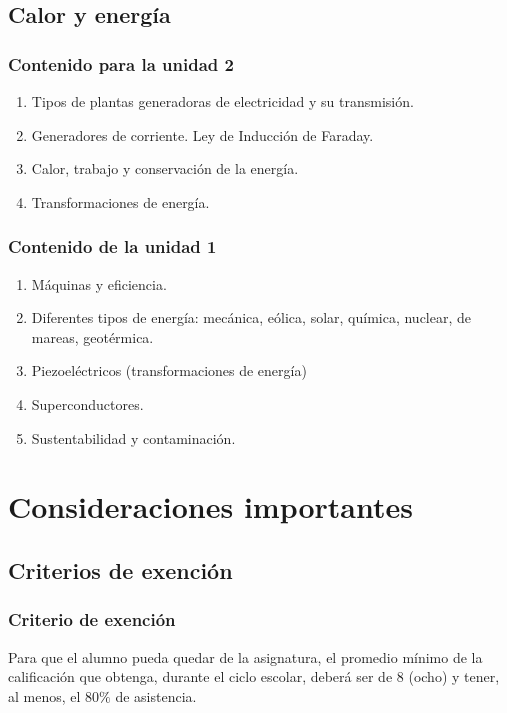 \documentclass[14pt]{beamer}
\begin{document}
\subsection{Calor y energía}

\begin{frame}
\frametitle{Contenido para la unidad 2}
\begin{enumerate}[<+->]
\item Tipos de plantas generadoras de electricidad y su transmisión.
\item Generadores de corriente. Ley de Inducción de Faraday.
\item Calor, trabajo y conservación de la energía.
\item Transformaciones de energía.
\seti
\end{enumerate}
\end{frame}
\begin{frame}
\frametitle{Contenido de la unidad 1}
\begin{enumerate}[<+->]
\conti
\item Máquinas y eficiencia.
\item Diferentes tipos de energía: mecánica, eólica, solar, química, nuclear, de mareas, geotérmica.
\item Piezoeléctricos (transformaciones de energía)
\item Superconductores.
\item Sustentabilidad y contaminación.
\end{enumerate}
\end{frame}

\section{Consideraciones importantes}
\subsection{Criterios de exención}

\begin{frame}
\frametitle{Criterio de exención}
Para que el alumno pueda quedar  de la asignatura, \pause el promedio mínimo de la calificación que obtenga, durante el ciclo escolar, deberá ser de 8 (ocho) y tener, al menos, el $80\%$ de asistencia.
\end{frame}
\end{document}
